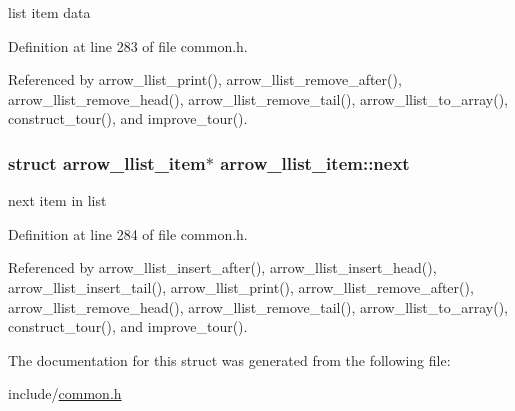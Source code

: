 list item data 

Definition at line 283 of file common.h.

Referenced by arrow\_\-llist\_\-print(), arrow\_\-llist\_\-remove\_\-after(), arrow\_\-llist\_\-remove\_\-head(), arrow\_\-llist\_\-remove\_\-tail(), arrow\_\-llist\_\-to\_\-array(), construct\_\-tour(), and improve\_\-tour().\hypertarget{structarrow__llist__item_81a998b260ab022b05f1ff572327b871}{
\subsubsection[{next}]{\setlength{\rightskip}{0pt plus 5cm}struct {\bf arrow\_\-llist\_\-item}$\ast$ {\bf arrow\_\-llist\_\-item::next}}}
\label{structarrow__llist__item_81a998b260ab022b05f1ff572327b871}


next item in list 

Definition at line 284 of file common.h.

Referenced by arrow\_\-llist\_\-insert\_\-after(), arrow\_\-llist\_\-insert\_\-head(), arrow\_\-llist\_\-insert\_\-tail(), arrow\_\-llist\_\-print(), arrow\_\-llist\_\-remove\_\-after(), arrow\_\-llist\_\-remove\_\-head(), arrow\_\-llist\_\-remove\_\-tail(), arrow\_\-llist\_\-to\_\-array(), construct\_\-tour(), and improve\_\-tour().

The documentation for this struct was generated from the following file:\begin{CompactItemize}
\item 
include/\hyperlink{common_8h}{common.h}\end{CompactItemize}
